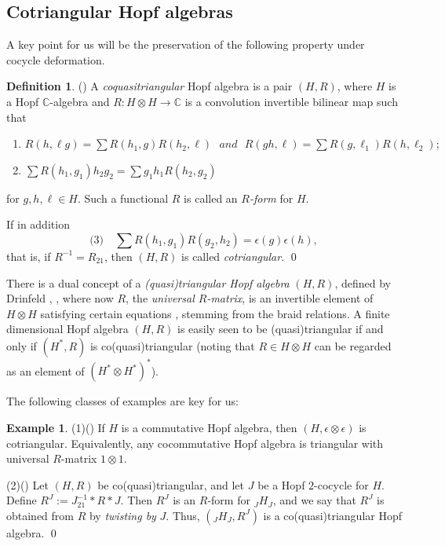 \documentclass{amsart}
\numberwithin{equation}{section}
\theoremstyle{definition}
\newtheorem{definition}[theorem]{Definition}
\newtheorem{example}[theorem]{Example}
\begin{document}
\subsection{Cotriangular Hopf algebras}\label{cotri1}
A key point for us will be the preservation of the following property under cocycle deformation.

\begin{definition}\label{cotridef} (\cite[Definition 8.3.19]{EGNO}) A \emph{coquasitriangular} Hopf algebra  is a pair $(H,R)$, where $H$ is a Hopf $\mathbb{C}$-algebra and $R: H \otimes H \rightarrow \mathbb{C}$ is a convolution invertible bilinear map such that
\begin{enumerate}
\item 
$R(h, \ell g )=\sum R(h_1, g)R(h_2, \ell)\,\, \textit{  and  }\,\, R(gh, \ell) = \sum R(g, \ell_1)R(h, \ell_2);$
\item
$\sum R(h_1,g_1)h_2g_2=\sum g_1 h_1 R(h_2,g_2)$
\end{enumerate}
for $g,h, \ell \in H$. Such a functional $R$ is called an \emph{$R$-form} for $H$.

If in addition
$$ \textrm{(3)} \quad \sum R(h_1,g_1)R(g_2,h_2)=\epsilon(g)\epsilon (h), $$
that is, if $R^{-1} = R_{21}$, then $(H,R)$ is called \emph{cotriangular}. \qed
\end{definition}

There is a dual concept of a \emph{(quasi)triangular Hopf algebra} $(H,R)$, defined by Drinfeld \cite{Dr2}, \cite[Definition 8.3.1]{EGNO}, where now $R$, the \emph{universal $R$-matrix}, is an invertible element of $H \otimes H$ satisfying certain equations \cite[(8.8), page 198]{EGNO}, stemming from the braid relations. A finite dimensional Hopf algebra $(H,R)$ is easily seen to be (quasi)triangular if and only if $(H^*, R)$ is co(quasi)triangular \cite[page 201]{EGNO} (noting that $R \in H \otimes H$ can be regarded as an element of $(H^* \otimes H^*)^*$).

The following classes of examples are key for us:  

\begin{example}\label{commex}(1)(\cite[Example 8.3.4]{EGNO}) If $H$ is a commutative Hopf algebra, then $(H,\epsilon\otimes\epsilon)$ is cotriangular. Equivalently, any cocommutative Hopf algebra is triangular with universal $R$-matrix $1 \otimes 1$.

(2)(\cite[Remark 8.3.24]{EGNO}) Let $(H,R)$ be co(quasi)triangular, and let $J$ be a Hopf $2$-cocycle for $H$. Define $R^J := J_{21}^{-1}\ast R\ast J$. Then $R^J$ is an $R$-form for ${}_JH_J$, and we say that $R^J$ is obtained from $R$ by \emph{twisting by} $J$. Thus, $({}_J H_J, R^J)$ is a co(quasi)triangular Hopf algebra. \qed 
\end{example}
\end{document}
